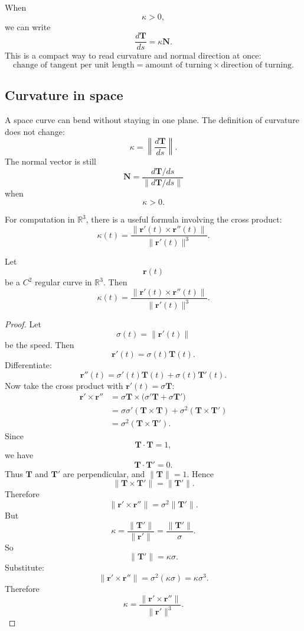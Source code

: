 When
\[
    \kappa>0,
\]
we can write
\[
\boxed{
    \frac{d\mathbf T}{ds}=\kappa\mathbf N.
}
\]
This is a compact way to read curvature and normal direction at once:
\[
    \text{change of tangent per unit length}
    =
    \text{amount of turning}\times\text{direction of turning}.
\]

\subsection{Curvature in space}

A space curve can bend without staying in one plane.  The definition of curvature does
not change:
\[
    \kappa=\left\|\frac{d\mathbf T}{ds}\right\|.
\]
The normal vector is still
\[
    \mathbf N=\frac{d\mathbf T/ds}{\|d\mathbf T/ds\|}
\]
when
\[
    \kappa>0.
\]

For computation in \(\mathbb R^3\), there is a useful formula involving the cross
product:
\[
\boxed{
    \kappa(t)=
    \frac{\|\mathbf r'(t)\times \mathbf r''(t)\|}
    {\|\mathbf r'(t)\|^3}.
}
\]

\begin{theorem}
Let
\[
    \mathbf r(t)
\]
be a \(C^2\) regular curve in \(\mathbb R^3\).  Then
\[
\boxed{
    \kappa(t)=
    \frac{\|\mathbf r'(t)\times \mathbf r''(t)\|}
    {\|\mathbf r'(t)\|^3}.
}
\]
\end{theorem}

\begin{proof}
Let
\[
    \sigma(t)=\|\mathbf r'(t)\|
\]
be the speed.  Then
\[
    \mathbf r'(t)=\sigma(t)\mathbf T(t).
\]
Differentiate:
\[
    \mathbf r''(t)=\sigma'(t)\mathbf T(t)+\sigma(t)\mathbf T'(t).
\]
Now take the cross product with \(\mathbf r'(t)=\sigma\mathbf T\):
\[
\begin{aligned}
    \mathbf r'\times\mathbf r''
    &=
    \sigma\mathbf T
    \times
    \bigl(\sigma'\mathbf T+\sigma\mathbf T'\bigr)\\
    &=
    \sigma\sigma'(\mathbf T\times\mathbf T)
    +
    \sigma^2(\mathbf T\times\mathbf T')\\
    &=
    \sigma^2(\mathbf T\times\mathbf T').
\end{aligned}
\]
Since
\[
    \mathbf T\cdot\mathbf T=1,
\]
we have
\[
    \mathbf T\cdot\mathbf T'=0.
\]
Thus \(\mathbf T\) and \(\mathbf T'\) are perpendicular, and \(\|\mathbf T\|=1\).  Hence
\[
    \|\mathbf T\times\mathbf T'\|=\|\mathbf T'\|.
\]
Therefore
\[
    \|\mathbf r'\times\mathbf r''\|
    =
    \sigma^2\|\mathbf T'\|.
\]
But
\[
    \kappa=\frac{\|\mathbf T'\|}{\|\mathbf r'\|}
    =
    \frac{\|\mathbf T'\|}{\sigma}.
\]
So
\[
    \|\mathbf T'\|=\kappa\sigma.
\]
Substitute:
\[
    \|\mathbf r'\times\mathbf r''\|
    =
    \sigma^2(\kappa\sigma)
    =
    \kappa\sigma^3.
\]
Therefore
\[
    \kappa=
    \frac{\|\mathbf r'\times\mathbf r''\|}{\|\mathbf r'\|^3}.
\]
\end{proof}

